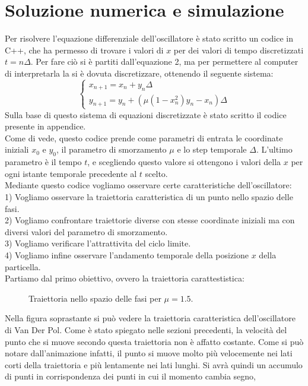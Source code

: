 \documentclass[12pt]{article}
\begin{document}
\section{Soluzione numerica e simulazione}
Per risolvere l'equazione differenziale dell'oscillatore è stato scritto un codice in C++, che ha permesso di trovare i valori di $x$ per dei valori di tempo discretizzati $t = n\Delta$. Per fare ciò si è partiti dall'equazione 2, ma per permettere al computer di interpretarla la si è dovuta discretizzare, ottenendo il seguente sistema:
\begin{equation}
	\begin{cases}
	x_{n+1} = x_n + y_n\Delta \\
	y_{n+1} = y_n + \left(\mu(1-x_n^2)y_n - x_n\right)\Delta
	\end{cases}
\end{equation} 
Sulla base di questo sistema di equazioni discretizzate è stato scritto il codice presente in appendice. \\
Come di vede, questo codice prende come parametri di entrata le coordinate iniziali $x_0$ e $y_0$, il parametro di smorzamento $\mu$ e lo step temporale $\Delta$. L'ultimo parametro è il tempo $t$, e scegliendo questo valore si ottengono i valori della $x$ per ogni istante temporale precedente al $t$ scelto. \\
	Mediante questo codice vogliamo osservare certe caratteristiche dell'oscillatore: \\
1) Vogliamo osservare la traiettoria caratteristica di un punto nello spazio delle fasi. \\
2) Vogliamo confrontare traiettorie diverse con stesse coordinate iniziali ma con diversi valori del parametro di smorzamento. \\
3) Vogliamo verificare l'attrattivita del ciclo limite. \\
4) Vogliamo infine osservare l'andamento temporale della posizione $x$ della particella. \\
Partiamo dal primo obiettivo, ovvero la traiettoria carattestistica: 
\begin{figure}[H]
	\centering
	\scalebox{0.7}{}
	\caption{Traiettoria nello spazio delle fasi per $\mu = 1.5$.}
\end{figure}
Nella figura soprastante si può vedere la traiettoria caratteristica dell'oscillatore di Van Der Pol. Come è stato spiegato nelle sezioni precedenti, la velocità del punto che si muove secondo questa traiettoria non è affatto costante.
Come si può notare dall'animazione infatti, il punto si muove molto più velocemente nei lati corti della traiettoria e più lentamente nei lati lunghi. Si avrà quindi un accumulo di punti in corrispondenza dei punti in cui il momento cambia segno,
\end{document}
